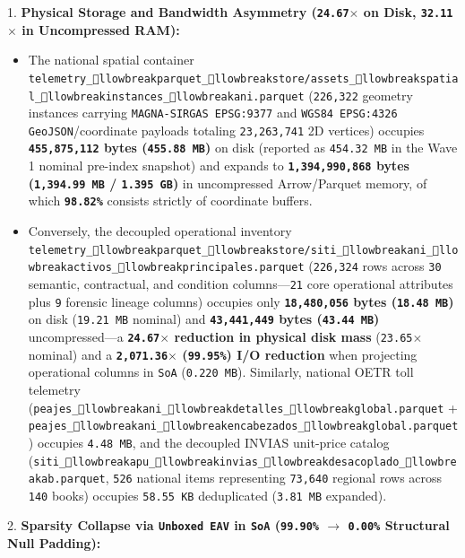 \documentclass[10pt,a4paper]{article}
\begin{document}
1. \textbf{Physical Storage and Bandwidth Asymmetry (\texttt{24.67$\times$} on Disk, \texttt{32.11$\times$} in Uncompressed RAM):}\par
\begin{itemize}
  \item The national spatial container \texttt{telemetry\_llowbreak{}parquet\_llowbreak{}store/assets\_llowbreak{}spatial\_llowbreak{}instances\_llowbreak{}ani.parquet} (\texttt{226,322} geometry instances carrying \texttt{MAGNA-SIRGAS EPSG:9377} and \texttt{WGS84 EPSG:4326} \texttt{GeoJSON}/coordinate payloads totaling \texttt{23,263,741} 2D vertices) occupies \textbf{\texttt{455,875,112} bytes (\texttt{455.88 MB})} on disk (reported as \texttt{454.32 MB} in the Wave 1 nominal pre-index snapshot) and expands to \textbf{\texttt{1,394,990,868} bytes (\texttt{1,394.99 MB} / \texttt{1.395 GB})} in uncompressed Arrow/Parquet memory, of which \textbf{\texttt{98.82\%}} consists strictly of coordinate buffers.
  \item Conversely, the decoupled operational inventory \texttt{telemetry\_llowbreak{}parquet\_llowbreak{}store/siti\_llowbreak{}ani\_llowbreak{}activos\_llowbreak{}principales.parquet} (\texttt{226,324} rows across \texttt{30} semantic, contractual, and condition columns---\texttt{21} core operational attributes plus \texttt{9} forensic lineage columns) occupies only \textbf{\texttt{18,480,056} bytes (\texttt{18.48 MB})} on disk (\texttt{19.21 MB} nominal) and \textbf{\texttt{43,441,449} bytes (\texttt{43.44 MB})} uncompressed---a \textbf{\texttt{24.67$\times$} reduction in physical disk mass} (\texttt{23.65$\times$} nominal) and a \textbf{\texttt{2,071.36$\times$} (\texttt{99.95\%}) I/O reduction} when projecting operational columns in \texttt{SoA} (\texttt{0.220 MB}). Similarly, national OETR toll telemetry (\texttt{peajes\_llowbreak{}ani\_llowbreak{}detalles\_llowbreak{}global.parquet} + \texttt{peajes\_llowbreak{}ani\_llowbreak{}encabezados\_llowbreak{}global.parquet}) occupies \texttt{4.48 MB}, and the decoupled INVIAS unit-price catalog (\texttt{siti\_llowbreak{}apu\_llowbreak{}invias\_llowbreak{}desacoplado\_llowbreak{}ab.parquet}, \texttt{526} national items representing \texttt{73,640} regional rows across \texttt{140} books) occupies \texttt{58.55 KB} deduplicated (\texttt{3.81 MB} expanded).
\end{itemize}
2. \textbf{Sparsity Collapse via \texttt{Unboxed EAV} in \texttt{SoA} (\texttt{99.90\%} $\to$ \texttt{0.00\%} Structural Null Padding):}\par
\end{document}

